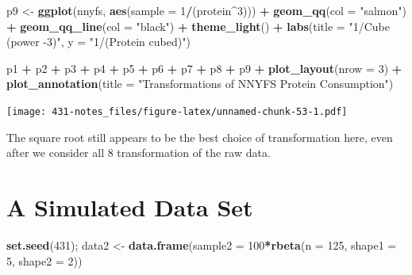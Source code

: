 \documentclass[
]{book}
\newenvironment{Shaded}{\begin{snugshade}}{\end{snugshade}}
\newcommand{\DataTypeTok}[1]{\textcolor[rgb]{0.13,0.29,0.53}{#1}}
\newcommand{\DecValTok}[1]{\textcolor[rgb]{0.00,0.00,0.81}{#1}}
\newcommand{\KeywordTok}[1]{\textcolor[rgb]{0.13,0.29,0.53}{\textbf{#1}}}
\newcommand{\NormalTok}[1]{#1}
\newcommand{\OperatorTok}[1]{\textcolor[rgb]{0.81,0.36,0.00}{\textbf{#1}}}
\newcommand{\StringTok}[1]{\textcolor[rgb]{0.31,0.60,0.02}{#1}}
\begin{document}
\begin{Shaded}
\begin{Highlighting}[]
\NormalTok{p9 <-}\StringTok{ }\KeywordTok{ggplot}\NormalTok{(nnyfs, }\KeywordTok{aes}\NormalTok{(}\DataTypeTok{sample =} \DecValTok{1}\OperatorTok{/}\NormalTok{(protein}\OperatorTok{^}\DecValTok{3}\NormalTok{))) }\OperatorTok{+}
\StringTok{    }\KeywordTok{geom_qq}\NormalTok{(}\DataTypeTok{col =} \StringTok{"salmon"}\NormalTok{) }\OperatorTok{+}\StringTok{ }
\StringTok{    }\KeywordTok{geom_qq_line}\NormalTok{(}\DataTypeTok{col =} \StringTok{"black"}\NormalTok{) }\OperatorTok{+}
\StringTok{    }\KeywordTok{theme_light}\NormalTok{() }\OperatorTok{+}
\StringTok{    }\KeywordTok{labs}\NormalTok{(}\DataTypeTok{title =} \StringTok{"1/Cube (power -3)"}\NormalTok{,}
         \DataTypeTok{y =} \StringTok{"1/(Protein cubed)"}\NormalTok{)}


\NormalTok{p1 }\OperatorTok{+}\StringTok{ }\NormalTok{p2 }\OperatorTok{+}\StringTok{ }\NormalTok{p3 }\OperatorTok{+}\StringTok{ }\NormalTok{p4 }\OperatorTok{+}\StringTok{ }\NormalTok{p5 }\OperatorTok{+}\StringTok{ }\NormalTok{p6 }\OperatorTok{+}\StringTok{ }\NormalTok{p7 }\OperatorTok{+}\StringTok{ }\NormalTok{p8 }\OperatorTok{+}\StringTok{ }\NormalTok{p9 }\OperatorTok{+}
\StringTok{    }\KeywordTok{plot_layout}\NormalTok{(}\DataTypeTok{nrow =} \DecValTok{3}\NormalTok{) }\OperatorTok{+}
\StringTok{    }\KeywordTok{plot_annotation}\NormalTok{(}\DataTypeTok{title =} \StringTok{"Transformations of NNYFS Protein Consumption"}\NormalTok{)}
\end{Highlighting}
\end{Shaded}

\texttt{[image: 431-notes\_files/figure-latex/unnamed-chunk-53-1.pdf]}

The square root still appears to be the best choice of transformation here, even after we consider all 8 transformation of the raw data.

\hypertarget{a-simulated-data-set}{%
\section{A Simulated Data Set}\label{a-simulated-data-set}}

\begin{Shaded}
\begin{Highlighting}[]
\KeywordTok{set.seed}\NormalTok{(}\DecValTok{431}\NormalTok{); }
\NormalTok{data2 <-}\StringTok{ }\KeywordTok{data.frame}\NormalTok{(}\DataTypeTok{sample2 =} \DecValTok{100}\OperatorTok{*}\KeywordTok{rbeta}\NormalTok{(}\DataTypeTok{n =} \DecValTok{125}\NormalTok{, }\DataTypeTok{shape1 =} \DecValTok{5}\NormalTok{, }\DataTypeTok{shape2 =} \DecValTok{2}\NormalTok{))}
\end{Highlighting}
\end{Shaded}
\end{document}
